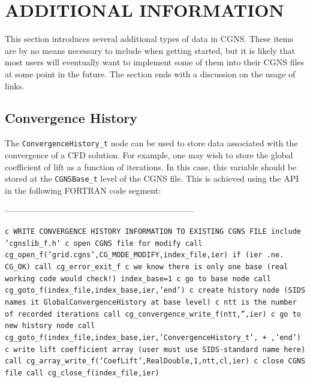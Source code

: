 \documentclass[12pt]{article}
\begin{document}
\newpage
\section{ADDITIONAL INFORMATION} \label{sec:advanced}

This section introduces several additional types of data in CGNS.
These items are by no means necessary to include when getting
started, but it is likely that most users will eventually want
to implement some of them into their CGNS files at some point in the future.
The section ends with a discussion on the usage of links.

\subsection{Convergence History} \label{sec:converge}

The {\tt ConvergenceHistory\_t} node can be used to store
data associated with the convergence of a CFD solution. 
For example, one may wish to store the global coefficient of lift
as a function of iterations.  In this case, 
this variable should be stored at the {\tt CGNSBase\_t} level
of the CGNS file.
This is achieved using the API in the following FORTRAN code 
segment:

--------------------------------------------------------------------

{\tt \noindent c  WRITE CONVERGENCE HISTORY INFORMATION TO EXISTING CGNS FILE
\newline\indent      include 'cgnslib\_f.h'
\newline c  open CGNS file for modify
\newline\indent      call cg\_open\_f('grid.cgns',CG\_MODE\_MODIFY,index\_file,ier)
\newline\indent      if (ier .ne. CG\_OK) call cg\_error\_exit\_f
\newline c  we know there is only one base (real working code would check!)
\newline\indent      index\_base=1
\newline c   go to base node
\newline\indent      call cg\_goto\_f(index\_file,index\_base,ier,'end')
\newline c   create history node (SIDS names it GlobalConvergenceHistory at base level)
\newline c   ntt is the number of recorded iterations
\newline\indent      call cg\_convergence\_write\_f(ntt,'',ier)
\newline c   go to new history node
\newline\indent      call cg\_goto\_f(index\_file,index\_base,ier,'ConvergenceHistory\_t',
\newline + ,'end')
\newline c   write lift coefficient array (user must use SIDS-standard name here)
\newline\indent      call cg\_array\_write\_f('CoefLift',RealDouble,1,ntt,cl,ier)
\newline c  close CGNS file
\newline\indent      call cg\_close\_f(index\_file,ier)}
\end{document}
